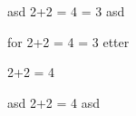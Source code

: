 \documentclass{minimal}
\begin{document}
asd
2+2 = 4
= 3 asd

for 2+2 = 4 = 3 etter

2+2 = 4

asd
2+2 = 4
asd
\end{document}
